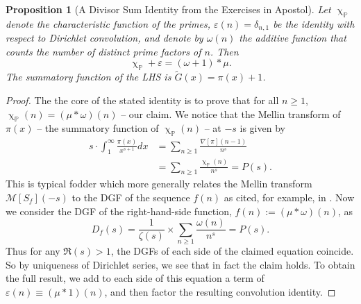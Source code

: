 \documentclass[11pt,reqno,a4letter]{article}
\numberwithin{figure}{section}
\numberwithin{table}{section}
\renewcommand{\chi}{\upchi}
\theoremstyle{plain}
\newtheorem{prop}[theorem]{Proposition}
\numberwithin{theorem}{section}
\theoremstyle{definition}
\begin{document}
\begin{prop}[A Divisor Sum Identity from the Exercises in Apostol] 
\label{prop_AntiqueDivisorSumIdent} 
Let $\chi_{\mathbb{P}}$ denote the characteristic function of the primes, 
$\varepsilon(n) = \delta_{n,1}$ be the identity with respect to Dirichlet convolution, 
and denote by $\omega(n)$ the additive function that counts the number of 
distinct prime factors of $n$. 
Then 
$$\chi_{\mathbb{P}} + \varepsilon = (\omega + 1) \ast \mu.$$ 
The summatory function of the LHS is $\widetilde{G}(x) = \pi(x)+1$.
\end{prop}
\begin{proof} 
The the core of the stated identity is to prove that for all $n \geq 1$, 
$\chi_{\mathbb{P}}(n) = (\mu \ast \omega)(n)$ -- our claim. 
We notice that the Mellin transform of $\pi(x)$ -- the summatory function of 
$\chi_{\mathbb{P}}(n)$ -- at $-s$ is given by 
\begin{align*} 
s \cdot \int_1^{\infty} \frac{\pi(x)}{x^{s+1}} dx & = \sum_{n \geq 1} \frac{\nabla[\pi](n-1)}{n^s} \\ 
     & = \sum_{n \geq 1} \frac{\chi_{\mathbb{P}}(n)}{n^s} = P(s). 
\end{align*} 
This is typical fodder which more generally relates the Mellin transform $\mathcal{M}[S_f](-s)$ to the 
DGF of the sequence $f(n)$ as cited, for example, in \cite[\S 11]{APOSTOLANUMT}. Now we consider the 
DGF of the right-hand-side function, $f(n) := (\mu \ast \omega)(n)$, as 
\[
D_f(s) = \frac{1}{\zeta(s)} \times \sum_{n \geq 1} \frac{\omega(n)}{n^s} = P(s).  
\]
Thus for any $\Re(s) > 1$, the DGFs of each side of the 
claimed equation coincide. So by uniqueness of Dirichlet series, we see that in fact the claim 
holds. To obtain the full result, we add to each side of this equation a term of 
$\varepsilon(n) \equiv (\mu \ast 1)(n)$, and then factor the resulting convolution identity. 
\end{proof} 
\end{document}
